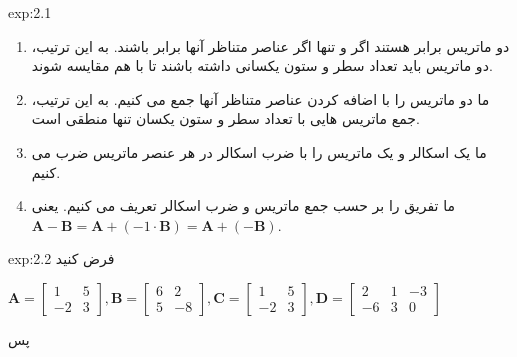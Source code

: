 {\begin{spacing}{1.5}
\begin{example}{exp:2.1}
            \begin{enumerate}[label=\textbf{\arabic*}.]
                \item {دو ماتریس برابر هستند اگر و تنها اگر عناصر متناظر آنها برابر باشند.
                به این ترتیب، دو ماتریس باید تعداد سطر و ستون یکسانی داشته باشند تا با هم مقایسه شوند.}
                \item {ما دو ماتریس را با اضافه کردن عناصر متناظر آنها جمع می کنیم.
                به این ترتیب، جمع ماتریس هایی با تعداد سطر و ستون یکسان تنها منطقی است.}
                \item {ما یک اسکالر و یک ماتریس را با ضرب اسکالر در هر عنصر ماتریس ضرب می کنیم.}
                \item {ما تفریق را بر حسب جمع ماتریس و ضرب اسکالر تعریف می کنیم. یعنی \\ $\textbf{A}-\textbf{B}=\textbf{A}+(-1\cdot\textbf{B})=\textbf{A}+(-\textbf{B})$.}
            \end{enumerate}
        \end{example}

        \begin{example}{exp:2.2}
            \Large
            فرض کنید\\
            \begin{flushleft}
                $\textbf{A}=\begin{bmatrix}
                                1  & 5 \\
                                -2 & 3
                \end{bmatrix}, \textbf{B}=\begin{bmatrix}
                                              6 & 2  \\
                                              5 & -8
                \end{bmatrix}, \textbf{C}=\begin{bmatrix}
                                              1  & 5 \\
                                              -2 & 3
                \end{bmatrix}, \textbf{D}=\begin{bmatrix}
                                              2  & 1 & -3 \\
                                              -6 & 3 & 0
                \end{bmatrix}$
            \end{flushleft}

            پس \\


\end{example}
\end{spacing}}
